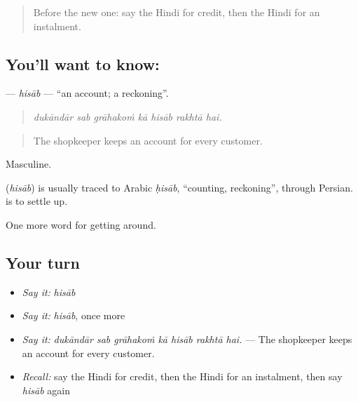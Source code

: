 \begin{quote}
Before the new one: say the Hindi for credit, then the Hindi for an instalment.
\end{quote}

\subsection*{You'll want to know: }
\textbf{} — \emph{hisāb} — \textquotedblleft{}an account; a reckoning\textquotedblright{}.

\begin{quote}
      
\end{quote}

\begin{quote}
\emph{dukāndār sab grāhakoṁ kā hisāb rakhtā hai.}
\end{quote}

\begin{quote}
The shopkeeper keeps an account for every customer.
\end{quote}

Masculine.

\begin{cousinweb}
\textbf{} (\emph{hisāb}) is usually traced to Arabic \emph{ḥisāb}, \textquotedblleft{}counting, reckoning\textquotedblright{}, through Persian.   is to settle up.
\end{cousinweb}

\begin{grammarlens}[title={What you've built}]
One more word for getting around.
\end{grammarlens}

\subsection*{Your turn}
\begin{itemize}
\raggedright
  \item \emph{Say it:} \emph{hisāb}
  \item \emph{Say it:} \emph{hisāb}, once more
  \item \emph{Say it:} \emph{dukāndār sab grāhakoṁ kā hisāb rakhtā hai.} — The shopkeeper keeps an account for every customer.
  \item \emph{Recall:} say the Hindi for credit, then the Hindi for an instalment, then say \emph{hisāb} again
\end{itemize}

